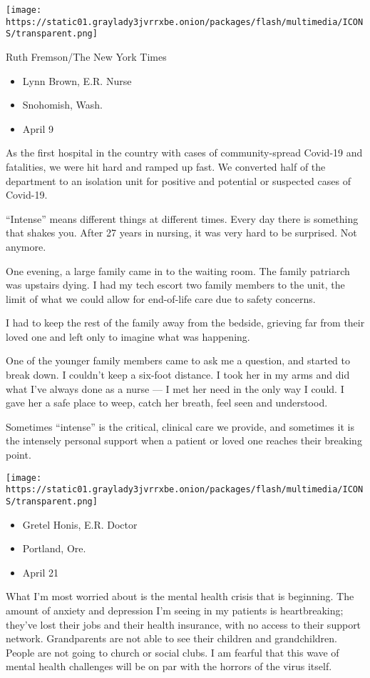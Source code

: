 \texttt{[image: https://static01.graylady3jvrrxbe.onion/packages/flash/multimedia/ICONS/transparent.png]}

Ruth Fremson/The New York Times

\begin{itemize}
\tightlist
\item
  Lynn Brown, E.R. Nurse
\item
  Snohomish, Wash.
\item
  April 9
\end{itemize}

As the first hospital in the country with cases of community-spread
Covid-19 and fatalities, we were hit hard and ramped up fast. We
converted half of the department to an isolation unit for positive and
potential or suspected cases of Covid-19.

``Intense'' means different things at different times. Every day there
is something that shakes you. After 27 years in nursing, it was very
hard to be surprised. Not anymore.

One evening, a large family came in to the waiting room. The family
patriarch was upstairs dying. I had my tech escort two family members to
the unit, the limit of what we could allow for end-of-life care due to
safety concerns.

I had to keep the rest of the family away from the bedside, grieving far
from their loved one and left only to imagine what was happening.

One of the younger family members came to ask me a question, and started
to break down. I couldn't keep a six-foot distance. I took her in my
arms and did what I've always done as a nurse --- I met her need in the
only way I could. I gave her a safe place to weep, catch her breath,
feel seen and understood.

Sometimes ``intense'' is the critical, clinical care we provide, and
sometimes it is the intensely personal support when a patient or loved
one reaches their breaking point.

\texttt{[image: https://static01.graylady3jvrrxbe.onion/packages/flash/multimedia/ICONS/transparent.png]}

\begin{itemize}
\tightlist
\item
  Gretel Honis, E.R. Doctor
\item
  Portland, Ore.
\item
  April 21
\end{itemize}

What I'm most worried about is the mental health crisis that is
beginning. The amount of anxiety and depression I'm seeing in my
patients is heartbreaking; they've lost their jobs and their health
insurance, with no access to their support network. Grandparents are not
able to see their children and grandchildren. People are not going to
church or social clubs. I am fearful that this wave of mental health
challenges will be on par with the horrors of the virus itself.

